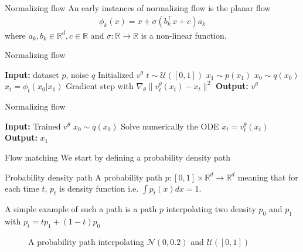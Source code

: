 \documentclass{beamer}
\begin{document}
\begin{frame}{Normalizing flow}
    An early instances  of normalizing flow is the planar flow 
    \begin{align*}
        \phi_k(x)=x+\sigma(b_k^\intercal x+c)a_k
    \end{align*}
    where \(a_k,b_k\in\mathbb{R}^d, c\in\mathbb{R}\) and  \(\sigma:\mathbb{R}\rightarrow\mathbb{R}\) is a non-linear function.
\end{frame}

\begin{frame}{Normalizing flow}
    \begin{algorithm}[H]
        \caption{Flow matching training}\label{alg:flow_matching_training}
            \begin{algorithmic}
                \State \textbf{Input:} dataset \(p\), noise \(q\)
                \State Initialized \(v^\theta\)
                    \State \(t\sim\mathcal{U}([0,1])\)
                    \State \(x_1\sim p(x_1)\)
                    \State \(x_0\sim q(x_0)\)
                    \State \(x_t=\phi_t(x_0|x_1)\)
                    \State Gradient step with \(\nabla_\theta \| v_t^\theta (x_t) -\dot{x}_t \|^2\)
                \EndWhile
                \State \textbf{Output:} \(v^\theta\)
            \end{algorithmic}
        \end{algorithm}
\end{frame}

\begin{frame}{Normalizing flow}
    \begin{algorithm}[H]
        \caption{Flow matching sampling}\label{alg:flow_matching_sampling}
            \begin{algorithmic}
                \State \textbf{Input:} Trained \(v^\theta\)
                \State \(x_0\sim q(x_0)\)
                \State Solve numerically the ODE \(\dot{x}_t=v_t^\theta(x_t)\)
                \State \textbf{Output:} \(x_1\)
            \end{algorithmic}
    \end{algorithm}
\end{frame}

\begin{frame}{Flow matching}
    We start by defining a probability density path
    \begin{block}{Probability density path}
        A probability path \(p:[0,1]\times\mathbb{R}^d\rightarrow\mathbb{R}^d\) meaning that for each time \(t\), \(p_t\) is density function i.e. \(\int p_t(x)dx=1\).\\
    \end{block}
    A simple example of such a path is a path \(p\) interpolating two density \(p_0\) and \(p_1\) with \(p_t=tp_1+(1-t)p_0\)
    \begin{figure}[htbp]
        \centering
        \caption{A probability path interpolating $\mathcal{N}(0,0.2)$ and $\mathcal{U}([0,1])$}
    \end{figure}
\end{frame}
\end{document}
